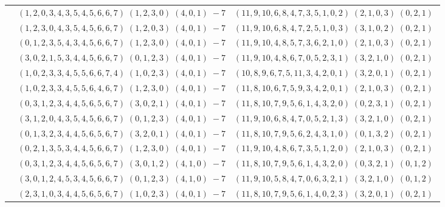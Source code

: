 \documentclass[11pt]{article}
\begin{document}
\begin{longtable}[l]{|c|c|c|}
 \cline{2-3} 
 & $(1 ,2 ,0 ,3 ,4 ,3 ,5 ,4 ,5 ,6 ,6 ,7) \;(1 ,2 ,3 ,0) \;(4 ,0 ,1) \;-7$ & $(11 ,9 ,10 ,6 ,8 ,4 ,7 ,3 ,5 ,1 ,0 ,2) \;(2 ,1 ,0 ,3) \;(0 ,2 ,1) \;$\\ 
 \cline{2-3} 
 & $(1 ,2 ,3 ,0 ,4 ,3 ,5 ,4 ,5 ,6 ,6 ,7) \;(1 ,2 ,0 ,3) \;(4 ,0 ,1) \;-7$ & $(11 ,9 ,10 ,6 ,8 ,4 ,7 ,2 ,5 ,1 ,0 ,3) \;(3 ,1 ,0 ,2) \;(0 ,2 ,1) \;$\\ 
 \cline{2-3} 
 & $(0 ,1 ,2 ,3 ,5 ,4 ,3 ,4 ,5 ,6 ,6 ,7) \;(1 ,2 ,3 ,0) \;(4 ,0 ,1) \;-7$ & $(11 ,9 ,10 ,4 ,8 ,5 ,7 ,3 ,6 ,2 ,1 ,0) \;(2 ,1 ,0 ,3) \;(0 ,2 ,1) \;$\\ 
 \cline{2-3} 
 & $(3 ,0 ,2 ,1 ,5 ,3 ,4 ,4 ,5 ,6 ,6 ,7) \;(0 ,1 ,2 ,3) \;(4 ,0 ,1) \;-7$ & $(11 ,9 ,10 ,4 ,8 ,6 ,7 ,0 ,5 ,2 ,3 ,1) \;(3 ,2 ,1 ,0) \;(0 ,2 ,1) \;$\\ 
 \cline{2-3} 
 & $(1 ,0 ,2 ,3 ,3 ,4 ,5 ,5 ,6 ,6 ,7 ,4) \;(1 ,0 ,2 ,3) \;(4 ,0 ,1) \;-7$ & $(10 ,8 ,9 ,6 ,7 ,5 ,11 ,3 ,4 ,2 ,0 ,1) \;(3 ,2 ,0 ,1) \;(0 ,2 ,1) \;$\\ 
 \cline{2-3} 
 & $(1 ,0 ,2 ,3 ,3 ,4 ,5 ,5 ,6 ,4 ,6 ,7) \;(1 ,2 ,3 ,0) \;(4 ,0 ,1) \;-7$ & $(11 ,8 ,10 ,6 ,7 ,5 ,9 ,3 ,4 ,2 ,0 ,1) \;(2 ,1 ,0 ,3) \;(0 ,2 ,1) \;$\\ 
 \cline{2-3} 
 & $(0 ,3 ,1 ,2 ,3 ,4 ,4 ,5 ,6 ,5 ,6 ,7) \;(3 ,0 ,2 ,1) \;(4 ,0 ,1) \;-7$ & $(11 ,8 ,10 ,7 ,9 ,5 ,6 ,1 ,4 ,3 ,2 ,0) \;(0 ,2 ,3 ,1) \;(0 ,2 ,1) \;$\\ 
 \cline{2-3} 
 & $(3 ,1 ,2 ,0 ,4 ,3 ,5 ,4 ,5 ,6 ,6 ,7) \;(0 ,1 ,2 ,3) \;(4 ,0 ,1) \;-7$ & $(11 ,9 ,10 ,6 ,8 ,4 ,7 ,0 ,5 ,2 ,1 ,3) \;(3 ,2 ,1 ,0) \;(0 ,2 ,1) \;$\\ 
 \cline{2-3} 
 & $(0 ,1 ,3 ,2 ,3 ,4 ,4 ,5 ,6 ,5 ,6 ,7) \;(3 ,2 ,0 ,1) \;(4 ,0 ,1) \;-7$ & $(11 ,8 ,10 ,7 ,9 ,5 ,6 ,2 ,4 ,3 ,1 ,0) \;(0 ,1 ,3 ,2) \;(0 ,2 ,1) \;$\\ 
 \cline{2-3} 
 & $(0 ,2 ,1 ,3 ,5 ,3 ,4 ,4 ,5 ,6 ,6 ,7) \;(1 ,2 ,3 ,0) \;(4 ,0 ,1) \;-7$ & $(11 ,9 ,10 ,4 ,8 ,6 ,7 ,3 ,5 ,1 ,2 ,0) \;(2 ,1 ,0 ,3) \;(0 ,2 ,1) \;$\\ 
 \cline{2-3} 
 & $(0 ,3 ,1 ,2 ,3 ,4 ,4 ,5 ,6 ,5 ,6 ,7) \;(3 ,0 ,1 ,2) \;(4 ,1 ,0) \;-7$ & $(11 ,8 ,10 ,7 ,9 ,5 ,6 ,1 ,4 ,3 ,2 ,0) \;(0 ,3 ,2 ,1) \;(0 ,1 ,2) \;$\\ 
 \cline{2-3} 
 & $(3 ,0 ,1 ,2 ,4 ,5 ,3 ,4 ,5 ,6 ,6 ,7) \;(0 ,1 ,2 ,3) \;(4 ,1 ,0) \;-7$ & $(11 ,9 ,10 ,5 ,8 ,4 ,7 ,0 ,6 ,3 ,2 ,1) \;(3 ,2 ,1 ,0) \;(0 ,1 ,2) \;$\\ 
 \cline{2-3} 
 & $(2 ,3 ,1 ,0 ,3 ,4 ,4 ,5 ,6 ,5 ,6 ,7) \;(1 ,0 ,2 ,3) \;(4 ,0 ,1) \;-7$ & $(11 ,8 ,10 ,7 ,9 ,5 ,6 ,1 ,4 ,0 ,2 ,3) \;(3 ,2 ,0 ,1) \;(0 ,2 ,1) \;$\\ 

\end{longtable}
\end{document}
